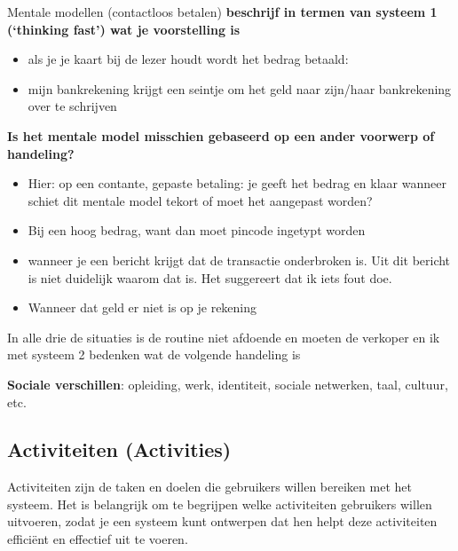 \documentclass[nonacm, sigconf, balance=true]{acmart}
\begin{document}
    \begin{voorbeeld}{Mentale modellen (contactloos betalen)}
        \textbf{beschrijf in termen van systeem 1 (‘thinking fast’) wat je voorstelling is}
        \begin{itemize}
            \item als je je kaart bij de lezer houdt wordt het bedrag betaald:
            \item mijn bankrekening krijgt een seintje om het geld naar zijn/haar bankrekening over te schrijven
        \end{itemize}

        \textbf{Is het mentale model misschien gebaseerd op een ander voorwerp of handeling?}
        \begin{itemize}
            \item Hier: op een contante, gepaste betaling: je geeft het bedrag en klaar wanneer schiet dit mentale model tekort of moet het aangepast worden?
            \item Bij een hoog bedrag, want dan moet pincode ingetypt worden
            \item wanneer je een bericht krijgt dat de transactie onderbroken is.
            Uit dit bericht is niet duidelijk waarom dat is.
            Het suggereert dat ik iets fout doe.
            \item Wanneer dat geld er niet is op je rekening
        \end{itemize}
        In alle drie de situaties is de routine niet afdoende en moeten de verkoper en ik met systeem 2 bedenken wat de volgende handeling is
    \end{voorbeeld}

    \textbf{Sociale verschillen}: opleiding, werk, identiteit, sociale netwerken, taal, cultuur, etc.

    \subsection{Activiteiten (Activities)}
    Activiteiten zijn de taken en doelen die gebruikers willen bereiken met het systeem.
    Het is belangrijk om te begrijpen welke activiteiten gebruikers willen uitvoeren, zodat je een systeem kunt ontwerpen dat hen helpt deze activiteiten efficiënt en effectief uit te voeren.
\end{document}
